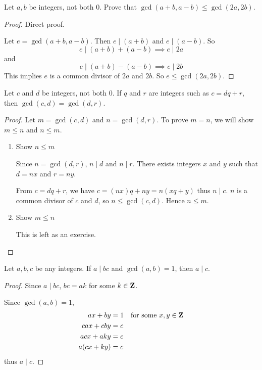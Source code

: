 \begin{prbm}
Let $a,b$ be integers, not both $0$. Prove that $\gcd(a+b,a-b)\le\gcd(2a,2b)$.
\end{prbm}

\begin{proof}
Direct proof.

Let $e=\gcd(a+b,a-b)$. Then $e\mid(a+b)$ and $e\mid(a-b)$. So
\[ e\mid(a+b)+(a-b) \implies e\mid 2a \]
and
\[ e\mid(a+b)-(a-b) \implies e\mid 2b \]
This implies $e$ is a common divisor of $2a$ and $2b$. So $e\le\gcd(2a,2b)$.
\end{proof}

\begin{prbm}
Let $c$ and $d$ be integers, not both $0$. If $q$ and $r$ are integers such as $c=dq+r$, then $\gcd(c,d)=\gcd(d,r)$.
\end{prbm}

\begin{proof}
Let $m=\gcd(c,d)$ and $n=\gcd(d,r)$. To prove $m=n$, we will show $m\le n$ and $n\le m$.

\begin{enumerate}[label=(\roman*)]
\item Show $n\le m$

Since $n=\gcd(d,r)$, $n\mid d$ and $n\mid r$. There exists integers $x$ and $y$ such that $d=nx$ and $r=ny$.

From $c=dq+r$, we have $c=(nx)q+ny=n(xq+y)$ thus $n\mid c$. $n$ is a common divisor of $c$ and $d$, so $n\le\gcd(c,d)$. Hence $n\le m$.

\item Show $m\le n$

This is left as an exercise.
\end{enumerate}
\end{proof}

\begin{prbm}
Let $a,b,c$ be any integers. If $a\mid bc$ and $\gcd(a,b)=1$, then $a\mid c$.
\end{prbm}

\begin{proof}
Since $a\mid bc$, $bc=ak$ for some $k\in\mathbf Z$.

Since $\gcd(a,b)=1$,
\begin{align*}
ax+by&=1 \quad \text{for some } x,y\in\mathbf Z \\
cax+cby&=c \\
acx+aky&=c \\
a(cx+ky)&=c
\end{align*}
thus $a\mid c$.
\end{proof}

